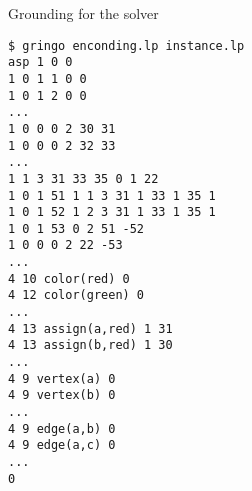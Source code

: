 \begin{frame}[fragile]{Grounding for the solver}
\begin{adjustbox}{max totalsize={\textwidth}{.83\textheight},keepaspectratio}
\begin{lstlisting}
$ gringo enconding.lp instance.lp
asp 1 0 0
1 0 1 1 0 0
1 0 1 2 0 0
...
1 0 0 0 2 30 31
1 0 0 0 2 32 33
...
1 1 3 31 33 35 0 1 22
1 0 1 51 1 1 3 31 1 33 1 35 1
1 0 1 52 1 2 3 31 1 33 1 35 1
1 0 1 53 0 2 51 -52
1 0 0 0 2 22 -53
...
4 10 color(red) 0
4 12 color(green) 0
...
4 13 assign(a,red) 1 31
4 13 assign(b,red) 1 30
...
4 9 vertex(a) 0
4 9 vertex(b) 0
...
4 9 edge(a,b) 0
4 9 edge(a,c) 0
...
0
\end{lstlisting}
\end{adjustbox}
\end{frame}
%
